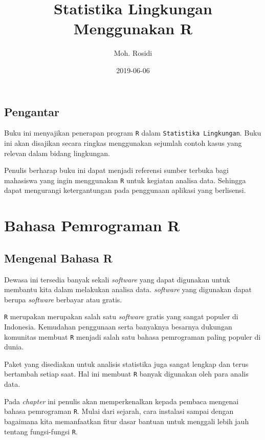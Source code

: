 \documentclass[]{book}
\title{Statistika Lingkungan Menggunakan R}
\author{Moh. Rosidi}
\date{2019-06-06}
\begin{document}
\maketitle

{
\hypersetup{linkcolor=black}
\setcounter{tocdepth}{1}
\tableofcontents
}
\listoftables
\listoffigures
\chapter*{Pengantar}\label{pengantar}

Buku ini menyajikan penerapan program \texttt{R} dalam
\texttt{Statistika\ Lingkungan}. Buku ini akan disajikan secara ringkas
menggunakan sejumlah contoh kasus yang relevan dalam bidang lingkungan.

Penulis berharap buku ini dapat menjadi referensi sumber terbuka bagi
mahasiswa yang ingin menggunakan \texttt{R} untuk kegiatan analisa data.
Sehingga dapat mengurangi ketergantungan pada penggunaan aplikasi yang
berlisensi.

\part*{Bahasa Pemrograman R}\label{part-bahasa-pemrograman-r}

\chapter{Mengenal Bahasa R}\label{mengenal-bahasa-r}

Dewasa ini tersedia banyak sekali \emph{software} yang dapat digunakan
untuk membantu kita dalam melakukan analisa data. \emph{software} yang
digunakan dapat berupa \emph{software} berbayar atau gratis.

\texttt{R} merupakan merupakan salah satu \emph{software} gratis yang
sangat populer di Indonesia. Kemudahan penggunaan serta banyaknya
besarnya dukungan komunitas membuat \texttt{R} menjadi salah satu bahasa
pemrograman paling populer di dunia.

Paket yang disediakan untuk analisis statistika juga sangat lengkap dan
terus bertambah setiap saat. Hal ini membuat \texttt{R} banyak digunakan
oleh para analis data.

Pada \emph{chapter} ini penulis akan memperkenalkan kepada pembaca
mengenai bahasa pemrograman \texttt{R}. Mulai dari sejarah, cara
instalasi sampai dengan bagaimana kita memanfaatkan fitur dasar bantuan
untuk menggali lebih jauh tentang fungsi-fungsi \texttt{R}.
\end{document}
